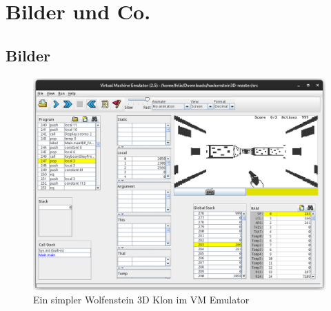 %
%








\section{Bilder und Co.}

\subsection{Bilder}%
\label{sec:figures}

\begin{figure}[h]
  \includegraphics[width=14cm]{fig/hackenstein-offiziell.png}
  \caption{Ein simpler Wolfenstein 3D Klon im VM Emulator}%
  \label{fig:hackenstein-offiziell}
\end{figure}


